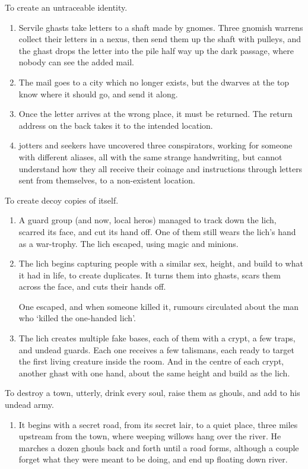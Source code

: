 \begin{multicols}{2}
\begin{dlist}
  \item
  To create an untraceable identity.
  \begin{enumerate}
    \item
    Servile \glspl{ghast} take letters to a shaft made by gnomes.
    Three gnomish warrens collect their letters in a nexus, then send them up the shaft with pulleys, and the \gls{ghast} drops the letter into the pile half way up the dark passage, where nobody can see the added mail.
    \item
    The mail goes to a city which no longer exists, but the dwarves at the top know where it should go, and send it along.
    \item
    Once the letter arrives at the wrong place, it must be returned.
    The return address on the back takes it to the intended location.
    \item
    \Glspl{jotter} and \glspl{seeker} have uncovered three conspirators, working for someone with different aliases, all with the same strange handwriting, but cannot understand how they all receive their coinage and instructions through letters sent from themselves, to a non-existent location.
  \end{enumerate}
  \item
  To create decoy copies of itself.
  \begin{enumerate}
    \item
    A \gls{guard} group (and now, local heros) managed to track down the \gls{lich}, scarred its face, and cut its hand off.
    One of them still wears the \gls{lich}'s hand as a war-trophy.
    The \gls{lich} escaped, using magic and minions.
    \item
    The \gls{lich} begins capturing people with a similar sex, height, and build to what it had in life, to create duplicates.
    It turns them into \glspl{ghast}, scars them across the face, and cuts their hands off.

    One escaped, and when someone killed it, rumours circulated about the man who `killed the one-handed \gls{lich}'.
    \item
    The \gls{lich} creates multiple fake bases, each of them with a crypt, a few traps, and undead guards.
    Each one receives a few \glspl{talisman}, each ready to target the first living creature inside the room.
    And in the centre of each crypt, another \gls{ghast} with one hand, about the same height and build as the \gls{lich}.
  \end{enumerate}
  \item
  To destroy a town, utterly, drink every soul, raise them as \glspl{ghoul}, and add to his undead army.
  \begin{enumerate}
    \item
    It begins with a secret road, from its secret lair, to a quiet place, three miles upstream from the town, where weeping willows hang over the river.
    He marches a dozen \glspl{ghoul} back and forth until a road forms, although a couple forget what they were meant to be doing, and end up floating down river.


\end{enumerate}
\end{dlist}
\end{multicols}
